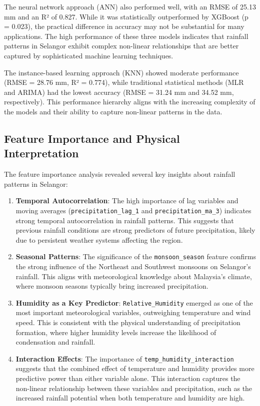 \documentclass[12pt]{article}
\begin{document}
The neural network approach (ANN) also performed well, with an RMSE of 25.13 mm and an R² of 0.827. While it was statistically outperformed by XGBoost (p = 0.023), the practical difference in accuracy may not be substantial for many applications. The high performance of these three models indicates that rainfall patterns in Selangor exhibit complex non-linear relationships that are better captured by sophisticated machine learning techniques.

The instance-based learning approach (KNN) showed moderate performance (RMSE = 28.76 mm, R² = 0.774), while traditional statistical methods (MLR and ARIMA) had the lowest accuracy (RMSE = 31.24 mm and 34.52 mm, respectively). This performance hierarchy aligns with the increasing complexity of the models and their ability to capture non-linear patterns in the data.

\subsection{Feature Importance and Physical Interpretation}
\label{subsec:feature_interpretation}

The feature importance analysis revealed several key insights about rainfall patterns in Selangor:

\begin{enumerate}
    \item \textbf{Temporal Autocorrelation}: The high importance of lag variables and moving averages (\texttt{precipitation\_lag\_1} and \texttt{precipitation\_ma\_3}) indicates strong temporal autocorrelation in rainfall patterns. This suggests that previous rainfall conditions are strong predictors of future precipitation, likely due to persistent weather systems affecting the region.
    
    \item \textbf{Seasonal Patterns}: The significance of the \texttt{monsoon\_season} feature confirms the strong influence of the Northeast and Southwest monsoons on Selangor's rainfall. This aligns with meteorological knowledge about Malaysia's climate, where monsoon seasons typically bring increased precipitation.
    
    \item \textbf{Humidity as a Key Predictor}: \texttt{Relative\_Humidity} emerged as one of the most important meteorological variables, outweighing temperature and wind speed. This is consistent with the physical understanding of precipitation formation, where higher humidity levels increase the likelihood of condensation and rainfall.
    
    \item \textbf{Interaction Effects}: The importance of \texttt{temp\_humidity\_interaction} suggests that the combined effect of temperature and humidity provides more predictive power than either variable alone. This interaction captures the non-linear relationship between these variables and precipitation, such as the increased rainfall potential when both temperature and humidity are high.
\end{enumerate}
\end{document}
